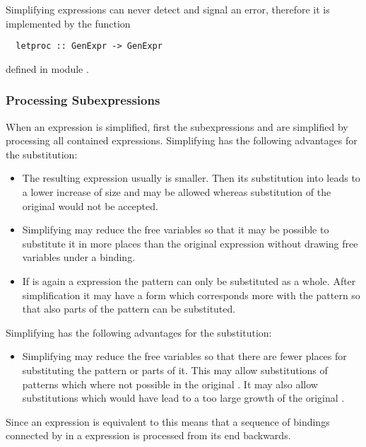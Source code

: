 Simplifying  expressions can never detect and signal an error, therefore it is implemented by the function
\begin{verbatim}
  letproc :: GenExpr -> GenExpr
\end{verbatim}
defined in module .

\subsubsection{Processing Subexpressions}

When an expression  is simplified, first the subexpressions  and  are
simplified by processing all contained  expressions. Simplifying  has the following advantages for the 
substitution:
\begin{itemize}
\item The resulting expression usually is smaller. Then its substitution into  leads to a lower increase of
size and may be allowed whereas substitution of the original  would not be accepted.
\item Simplifying may reduce the free variables so that it may be possible to substitute it in more places than
the original expression without drawing free variables under a binding.
\item If  is again a  expression the pattern can only be substituted as a whole. After simplification 
it may have a form which corresponds more with the pattern so that also parts of the pattern can be substituted.
\end{itemize}
Simplifying  has the following advantages for the substitution:
\begin{itemize}
\item Simplifying may reduce the free variables so that there are fewer places for substituting the pattern
or parts of it. This may allow substitutions of patterns which where not possible in the original .
It may also allow substitutions which would have lead to a too large growth of the original .
\end{itemize}

Since an expression  is equivalent to  this means that a sequence of bindings connected by  in a  expression is processed
from its end backwards.

